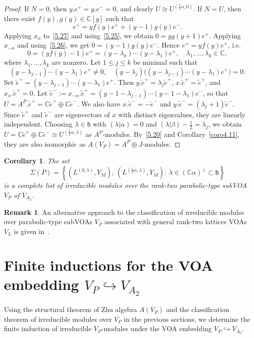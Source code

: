\documentclass[12pt,a4paper,reqno]{amsart}
\numberwithin{equation}{section}
\numberwithin{equation}{section}
\newtheorem{coro}[thm]{Corollary}
\theoremstyle{definition}
\newtheorem{remark}[thm]{Remark}
\def \C {\mathbb{C}}
\def\la{\lambda}
\def \al{\alpha}
\def\hr{\hookrightarrow}
\def \b {\beta}
\def \op {\oplus}
\def \h {\mathfrak{h}}
\begin{document}
\begin{proof}
		If $N=0$, then $y.e^+=y.e^-=0$, and clearly $U\cong U^{(\frac{1}{2}\al,0)}$.  
		If $N=U$, then there exist $f(y),g(y)\in\C[y]$ such that
		\begin{equation}\label{5.27}
			e^+=y f(y)e^+ + (y-1)g(y)e^-.
		\end{equation}
		Applying $x_\al$ to~\eqref{5.27} and using~\eqref{5.25}, we obtain 
		$0=y g(y+1)e^+$.  
		Applying $x_{-\al}$ and using~\eqref{5.26}, we get $0=(y-1)g(y)e^-$.  
		Hence $e^+=y f(y)e^+$, i.e.
		$$
		0=(y f(y)-1)e^+=(y-\la_k)\cdots(y-\la_1)e^+,
		\quad \la_1,\dots,\la_k\in\C,
		$$
		where $\la_1,\dots,\la_k$ are nonzero.  
		Let $1\le j\le k$ be minimal such that
		\[
		(y-\la_{j-1})\cdots(y-\la_1)e^+\neq0,\quad
		(y-\la_j)\big((y-\la_{j-1})\cdots(y-\la_1)e^+\big)=0.
		\]
		Set $\tilde e^+=(y-\la_{j-1})\cdots(y-\la_1)e^+$.  
		Then $y.\tilde e^+=\la_j\tilde e^+$, 
		$x.\tilde e^+=\tilde e^+$, and $x_\al.\tilde e^+=0$.  
		Let $\tilde e^-:=x_{-\al}.\tilde e^+=(y-1-\la_{j-1})\cdots(y-1-\la_1)e^-$,  
		so that $U=A^P.\tilde e^+=\C\tilde e^+\op\C\tilde e^-$.  
		We also have $x.\tilde e^-=-\tilde e^-$ and $y.\tilde e^-=(\la_j+1)\tilde e^-$.  
		Since $\tilde e^+$ and $\tilde e^-$ are eigenvectors of $x$ with distinct eigenvalues,
		they are linearly independent.  
		Choosing $\la\in\h$ with $(\la|\al)=0$ and $(\la|\b)-\frac{1}{2}=\la_j$, we obtain 
		$U=\C\tilde e^+\op\C\tilde e^-\cong U^{(\frac{1}{2}\al,\la)}$ as $A^P$-modules.  
		By~\eqref{5.20} and Corollary~\ref{coro4.11}, they are also isomorphic as $A(V_P)=A^P\op J$-modules.
	\end{proof}
	
	\begin{coro}\label{coro5.7}
		The set
		\[
		\Sigma(P)
		=\left\{ (L^{(0,\la)},Y_M),\, (L^{(\frac{1}{2}\al,\la)},Y_M)
		:\, \la\in (\C\al)^\perp\subset \h \right\}
		\]
		is a complete list of irreducible modules over the rank-two parabolic-type subVOA $V_P$ of $V_{A_2}$.
	\end{coro}
	
	\begin{remark}
		An alternative approach to the classification of irreducible modules over parabolic-type subVOAs $V_P$ associated with general rank-two lattices VOAs $V_L$ is given in~\cite{LS25}.
	\end{remark}	
	
	\section{Finite inductions for the VOA embedding $V_P\hookrightarrow V_{A_2}$}	\label{sec:8}
	Using the structural theorem of Zhu algebra $A(V_P)$ and the classification theorem of irreducible modules over $V_P$ in the previous sections, we determine the finite induction of irreducible $V_P$-modules under the VOA embedding $V_P\hr V_{A_2}$. 
	
\end{document}

